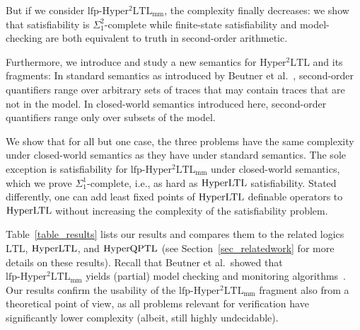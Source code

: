 \documentclass[dvipsnames,10pt,a4paper]{amsart}
\theoremstyle{definition}
\theoremstyle{remark}
\newcommand{\ltl}{\mathrm{LTL}\xspace}
\newcommand{\hyltl}{\mathrm{Hyper\-LTL}\xspace}
\newcommand{\hyqptl}{\mathrm{Hyper\-QPTL}\xspace}
\newcommand{\sohyltl}{\mathrm{Hyper^2LTL}\xspace}
\newcommand{\lfpsohyltlfp}{\mathrm{lfp\text{-}{Hyper^2LTL_{\mathrm{mm}}}}\xspace}
\begin{document}
But if we consider $\lfpsohyltlfp$, the complexity finally decreases: we show that satisfiability is $\Sigma_1^2$-complete while finite-state satisfiability and model-checking are both equivalent to truth in second-order arithmetic.

Furthermore, we introduce and study a new semantics for $\sohyltl$ and its fragments: 
In standard semantics as introduced by Beutner et al.~\cite{DBLP:conf/cav/BeutnerFFM23}, second-order quantifiers range over arbitrary sets of traces that may contain traces that are not in the model.
In closed-world semantics introduced here, second-order quantifiers range only over subsets of the model. 

We show that for all but one case, the three problems have the same complexity under closed-world semantics as they have under standard semantics. 
The sole exception is satisfiability for $\lfpsohyltlfp$ under closed-world semantics, which we prove $\Sigma_1^1$-complete, i.e., as hard as $\hyltl$ satisfiability.
Stated differently, one can add least fixed points of $\hyltl$ definable operators to $\hyltl$ without increasing the complexity of the satisfiability problem. 


Table~\ref{table_results} lists our results and compares them to the related logics~$\ltl$, $\hyltl$, and $\hyqptl$ (see Section~\ref{sec_relatedwork} for more details on these results). 
Recall that Beutner et al.\ showed that $\lfpsohyltlfp$ yields (partial) model checking and monitoring algorithms~\cite{DBLP:conf/cav/BeutnerFFM23,BeutnerFFM24}. 
Our results confirm the usability of the $\lfpsohyltlfp$ fragment also from a theoretical point of view, as all problems relevant for verification have significantly lower complexity (albeit, still  highly undecidable).
\end{document}
